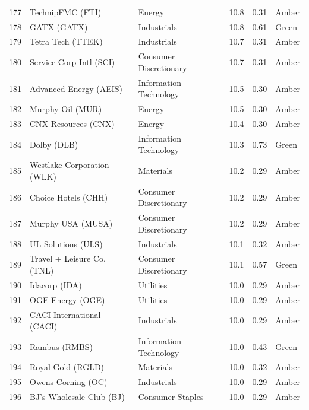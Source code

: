 \documentclass[11pt,a4paper]{article}
\begin{document}
{\begin{longtable}{r p{4.6cm} p{3cm} r r l}
177 & TechnipFMC (FTI) & Energy & 10.8 & 0.31 & \cellcolor[HTML]{FFEB9C}Amber \\
178 & GATX (GATX) & Industrials & 10.8 & 0.61 & \cellcolor[HTML]{C6EFCE}Green \\
179 & Tetra Tech (TTEK) & Industrials & 10.7 & 0.31 & \cellcolor[HTML]{FFEB9C}Amber \\
180 & Service Corp Intl (SCI) & Consumer Discretionary & 10.7 & 0.31 & \cellcolor[HTML]{FFEB9C}Amber \\
181 & Advanced Energy (AEIS) & Information Technology & 10.5 & 0.30 & \cellcolor[HTML]{FFEB9C}Amber \\
182 & Murphy Oil (MUR) & Energy & 10.5 & 0.30 & \cellcolor[HTML]{FFEB9C}Amber \\
183 & CNX Resources (CNX) & Energy & 10.4 & 0.30 & \cellcolor[HTML]{FFEB9C}Amber \\
184 & Dolby (DLB) & Information Technology & 10.3 & 0.73 & \cellcolor[HTML]{C6EFCE}Green \\
185 & Westlake Corporation (WLK) & Materials & 10.2 & 0.29 & \cellcolor[HTML]{FFEB9C}Amber \\
186 & Choice Hotels (CHH) & Consumer Discretionary & 10.2 & 0.29 & \cellcolor[HTML]{FFEB9C}Amber \\
187 & Murphy USA (MUSA) & Consumer Discretionary & 10.2 & 0.29 & \cellcolor[HTML]{FFEB9C}Amber \\
188 & UL Solutions (ULS) & Industrials & 10.1 & 0.32 & \cellcolor[HTML]{FFEB9C}Amber \\
189 & Travel + Leisure Co. (TNL) & Consumer Discretionary & 10.1 & 0.57 & \cellcolor[HTML]{C6EFCE}Green \\
190 & Idacorp (IDA) & Utilities & 10.0 & 0.29 & \cellcolor[HTML]{FFEB9C}Amber \\
191 & OGE Energy (OGE) & Utilities & 10.0 & 0.29 & \cellcolor[HTML]{FFEB9C}Amber \\
192 & CACI International (CACI) & Industrials & 10.0 & 0.29 & \cellcolor[HTML]{FFEB9C}Amber \\
193 & Rambus (RMBS) & Information Technology & 10.0 & 0.43 & \cellcolor[HTML]{C6EFCE}Green \\
194 & Royal Gold (RGLD) & Materials & 10.0 & 0.32 & \cellcolor[HTML]{FFEB9C}Amber \\
195 & Owens Corning (OC) & Industrials & 10.0 & 0.29 & \cellcolor[HTML]{FFEB9C}Amber \\
196 & BJ's Wholesale Club (BJ) & Consumer Staples & 10.0 & 0.29 & \cellcolor[HTML]{FFEB9C}Amber \\

\end{longtable}}
\end{document}
